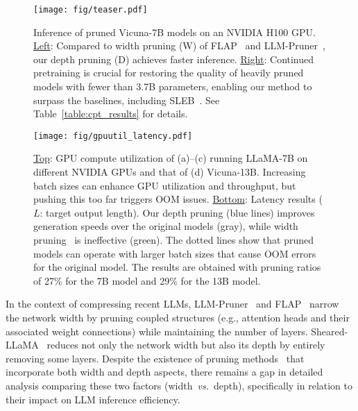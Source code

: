 \begin{figure}[t]
  \centering
    \texttt{[image: fig/teaser.pdf]}
        \vspace{-0.25in}
  \caption{Inference of pruned Vicuna-7B models on an NVIDIA H100 GPU. \uline{Left}: Compared to width pruning (W) of FLAP~\cite{flap} and LLM-Pruner~\cite{llmpruner}, our depth pruning (D) achieves faster inference. \uline{Right}: Continued pretraining is crucial for restoring the quality of heavily pruned models with fewer than 3.7B parameters, enabling our method to surpass the baselines, including SLEB~\cite{song2024sleb}. See Table~\ref{table:cpt_results} for details.} \label{fig_teaser}
  \vspace{-0.1in}
\end{figure}

\begin{figure*}[t]
  \centering
    \texttt{[image: fig/gpuutil\_latency.pdf]}
        \vspace{-0.23in}
  \caption{\uline{Top}: GPU compute utilization of (a)–(c) running LLaMA-7B on different NVIDIA GPUs and that of (d) Vicuna-13B. Increasing batch sizes can enhance GPU utilization and throughput, but pushing this too far triggers OOM issues. \uline{Bottom}: Latency results ($L$: target output length). Our depth pruning (blue lines) improves generation speeds over the original models (gray), while width pruning~\cite{llmpruner} is ineffective (green). The dotted lines show that pruned models can operate with larger batch sizes that cause OOM errors for the original model. The results are obtained with pruning ratios of 27\% for the 7B model and 29\% for the 13B model.
  }
  \vspace{-0.1in}
  \label{fig_gpuutil}
\end{figure*}

In the context of compressing recent LLMs, LLM-Pruner~\cite{llmpruner} and FLAP~\cite{flap} narrow the network width by pruning coupled structures (e.g., attention heads and their associated weight connections) while maintaining the number of layers. Sheared-LLaMA~\cite{xia2023sheared} reduces not only the network width but also its depth by entirely removing some layers. Despite the existence of pruning methods~\cite{xia2022structured,kurtic2023ziplm,xia2023sheared} that incorporate both width and depth aspects, there remains a gap in detailed analysis comparing these two factors (width~\textit{vs.}~depth), specifically in relation to their impact on LLM inference efficiency.

